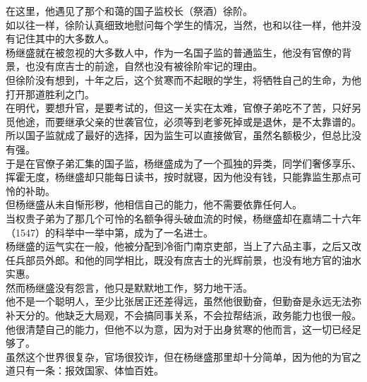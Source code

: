 \begin{multicols}{\theparacolNo}
在这里，他遇见了那个和蔼的国子监校长（祭酒）徐阶。\\

如以往一样，徐阶认真细致地慰问每个学生的情况，当然，也和以往一样，他并没有记住其中的大多数人。\\

杨继盛就在被忽视的大多数人中，作为一名国子监的普通监生，他没有官僚的背景，也没有庶吉士的前途，自然也没有被徐阶牢记的理由。\\

但徐阶没有想到，十年之后，这个贫寒而不起眼的学生，将牺牲自己的生命，为他打开那道胜利之门。\\

在明代，要想升官，是要考试的，但这一关实在太难，官僚子弟吃不了苦，只好另觅他途，而要继承父亲的世袭官位，必须等到老爹死掉或是退休，是不太靠谱的。\\

所以国子监就成了最好的选择，因为监生可以直接做官，虽然名额极少，但总比没有强。\\

于是在官僚子弟汇集的国子监，杨继盛成为了一个孤独的异类，同学们奢侈享乐、挥霍无度，杨继盛却只能每日读书，按时就寝，因为他没有钱，只能靠监生那点可怜的补助。\\

但杨继盛从未自惭形秽，他相信自己的能力，他不需要依靠任何人。\\

当权贵子弟为了那几个可怜的名额争得头破血流的时候，杨继盛却在嘉靖二十六年（1547）的科举中一举中第，成为了一名进士。\\

杨继盛的运气实在一般，他被分配到冷衙门南京吏部，当上了六品主事，之后又改任兵部员外郎。和他的同学相比，既没有庶吉士的光辉前景，也没有地方官的油水实惠。\\

然而杨继盛没有怨言，他只是默默地工作，努力地干活。\\

他不是一个聪明人，至少比张居正还差得远，虽然他很勤奋，但勤奋是永远无法弥补天分的。他缺乏大局观，不会搞同事关系，不会拉帮结派，政务能力也很一般。\\

他很清楚自己的能力，但他不以为意，因为对于出身贫寒的他而言，这一切已经足够了。\\

虽然这个世界很复杂，官场很狡诈，但在杨继盛那里却十分简单，因为他的为官之道只有一条：报效国家、体恤百姓。\\


\end{multicols}
